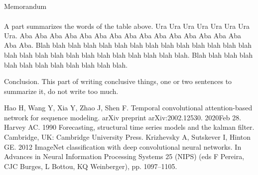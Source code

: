 \documentclass[12pt]{ctexart}
\newcommand{\upcite}[1]{\textsuperscript{\textsuperscript{\cite{#1}}}}%
\begin{document}
\begin{letter}{ \centering Memorandum }
	\vspace{-0.2cm}

	A part summarizes\upcite{1,2} the words of the table above. Ura Ura Ura Ura Ura Ura Ura Ura. Aba Aba Aba Aba Aba Aba Aba Aba Aba Aba Aba Aba Aba Aba Aba Aba Aba. Blah blah blah blah blah blah blah blah blah blah blah blah blah blah blah blah blah blah blah blah blah blah blah blah blah blah. Blah blah blah blah blah blah blah blah blah blah blah blah.


	Conclusion. This part of writing conclusive things, one or two sentences to summarize it, do not write too much.
\end{letter}




\newpage
\clearpage
\lhead{\small \team}
\chead{}
\begin{thebibliography}{99}
   
     Hao H, Wang Y, Xia Y, Zhao J, Shen F. Temporal convolutional attention-based network for sequence modeling. arXiv preprint arXiv:2002.12530. 2020Feb 28.
     Harvey AC. 1990 Forecasting, structural time series models and the kalman filter. Cambridge, UK: Cambridge University Press.
     Krizhevsky A, Sutskever I, Hinton GE. 2012 ImageNet classification with deep convolutional neural networks. In Advances in Neural Information Processing Systems 25 (NIPS) (eds F Pereira, CJC Burges, L Bottou, KQ Weinberger), pp. 1097–1105.
    \end{thebibliography}
\end{document}
